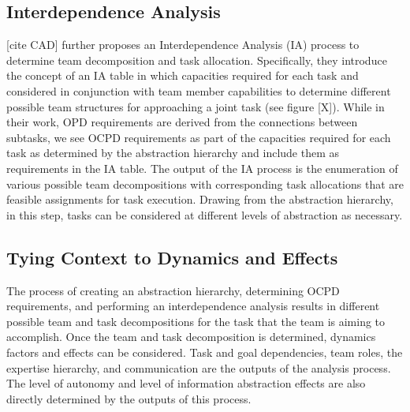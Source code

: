 \documentclass[letterpaper, 10 pt, conference]{ieeeconf}  %
\theoremstyle{definition}
\begin{document}
\subsection{Interdependence Analysis}
[cite CAD] further proposes an Interdependence Analysis (IA) process to determine team decomposition and task allocation. Specifically, they introduce the concept of an IA table in which capacities required for each task and considered in conjunction with team member capabilities to determine different possible team structures for approaching a joint task (see figure [X]). While in their work, OPD requirements are derived from the connections between subtasks, we see OCPD requirements as part of the capacities required for each task as determined by the abstraction hierarchy and include them as requirements in the IA table. The output of the IA process is the enumeration of various possible team decompositions with corresponding task allocations that are feasible assignments for task execution. Drawing from the abstraction hierarchy, in this step, tasks can be considered at different levels of abstraction as necessary. 

\subsection{Tying Context to Dynamics and Effects}
The process of creating an abstraction hierarchy, determining OCPD requirements, and performing an interdependence analysis results in different possible team and task decompositions for the task that the team is aiming to accomplish. Once the team and task decomposition is determined, dynamics factors and effects can be considered. Task and goal dependencies, team roles, the expertise hierarchy, and communication are the outputs of the analysis process. The level of autonomy and level of information abstraction effects are also directly determined by the outputs of this process. 

\end{document}
